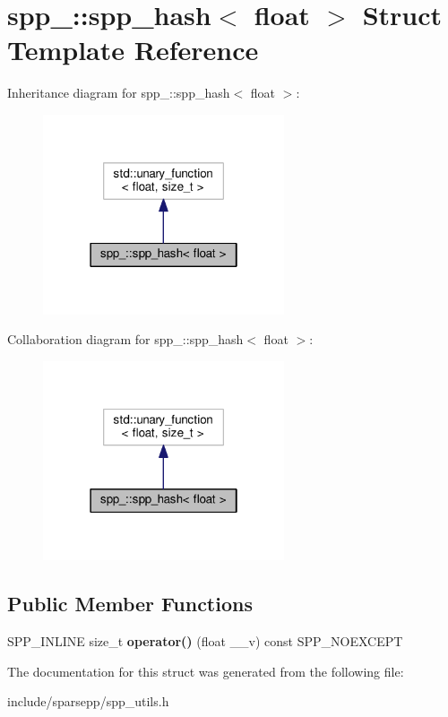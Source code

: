 \hypertarget{structspp___1_1spp__hash_3_01float_01_4}{}\section{spp\+\_\+\+:\+:spp\+\_\+hash$<$ float $>$ Struct Template Reference}
\label{structspp___1_1spp__hash_3_01float_01_4}


Inheritance diagram for spp\+\_\+\+:\+:spp\+\_\+hash$<$ float $>$\+:\nopagebreak
\begin{figure}[H]
\begin{center}
\leavevmode
\includegraphics[width=202pt]{structspp___1_1spp__hash_3_01float_01_4__inherit__graph}
\end{center}
\end{figure}


Collaboration diagram for spp\+\_\+\+:\+:spp\+\_\+hash$<$ float $>$\+:\nopagebreak
\begin{figure}[H]
\begin{center}
\leavevmode
\includegraphics[width=202pt]{structspp___1_1spp__hash_3_01float_01_4__coll__graph}
\end{center}
\end{figure}
\subsection*{Public Member Functions}
\begin{DoxyCompactItemize}
\item 
S\+P\+P\+\_\+\+I\+N\+L\+I\+NE size\+\_\+t {\bfseries operator()} (float \+\_\+\+\_\+v) const S\+P\+P\+\_\+\+N\+O\+E\+X\+C\+E\+PT\hypertarget{structspp___1_1spp__hash_3_01float_01_4_ad3ffc9dda030f08d1d21cb6571c22de1}{}\label{structspp___1_1spp__hash_3_01float_01_4_ad3ffc9dda030f08d1d21cb6571c22de1}

\end{DoxyCompactItemize}


The documentation for this struct was generated from the following file\+:\begin{DoxyCompactItemize}
\item 
include/sparsepp/spp\+\_\+utils.\+h\end{DoxyCompactItemize}
